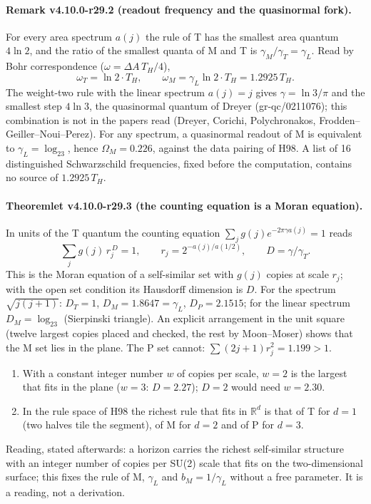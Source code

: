 \paragraph{Remark v4.10.0-r29.2 (readout frequency and the quasinormal fork).}
For every area spectrum \(a(j)\) the rule of T has the smallest area quantum \(4\ln2\), and the ratio of the smallest quanta of M and T is
\(\gamma_M/\gamma_T=\gamma_L\).  Read by Bohr correspondence (\(\omega=\Delta A\,T_H/4\)),
\[
\omega_T=\ln2\cdot T_H,\qquad \omega_M=\gamma_L\ln2\cdot T_H=1.2925\,T_H .
\]
The weight-two rule with the linear spectrum \(a(j)=j\) gives \(\gamma=\ln3/\pi\) and the smallest step \(4\ln3\), the quasinormal quantum of Dreyer
(gr-qc/0211076); this combination is not in the papers read (Dreyer, Corichi, Polychronakos, Frodden--Geiller--Noui--Perez).  For any spectrum, a
quasinormal readout of M is equivalent to \(\gamma_L=\log_23\), hence \(\Omega_M=0.226\), against the data pairing of H98.  A list of 16 distinguished
Schwarzschild frequencies, fixed before the computation, contains no source of \(1.2925\,T_H\).

\paragraph{Theoremlet v4.10.0-r29.3 (the counting equation is a Moran equation).}
In units of the T quantum the counting equation \(\sum_jg(j)e^{-2\pi\gamma a(j)}=1\) reads
\[
\sum_j g(j)\,r_j^{\,D}=1,\qquad r_j=2^{-a(j)/a(1/2)},\qquad D=\gamma/\gamma_T .
\]
This is the Moran equation of a self-similar set with \(g(j)\) copies at scale \(r_j\); with the open set condition its Hausdorff dimension is
\(D\).  For the spectrum \(\sqrt{j(j+1)}\): \(D_T=1\), \(D_M=1.8647=\gamma_L\), \(D_P=2.1515\); for the linear spectrum \(D_M=\log_23\) (Sierpinski
triangle).  An explicit arrangement in the unit square (twelve largest copies placed and checked, the rest by Moon--Moser) shows that the M set lies in
the plane.  The P set cannot: \(\sum(2j+1)r_j^2=1.199>1\).
\begin{enumerate}[leftmargin=2em]
\item[(a)] With a constant integer number \(w\) of copies per scale, \(w=2\) is the largest that fits in the plane (\(w=3\): \(D=2.27\)); \(D=2\) would
need \(w=2.30\).
\item[(b)] In the rule space of H98 the richest rule that fits in \(\mathbb R^d\) is that of T for \(d=1\) (two halves tile the segment), of M for
\(d=2\) and of P for \(d=3\).
\end{enumerate}
Reading, stated afterwards: a horizon carries the richest self-similar structure with an integer number of copies per SU(2) scale that fits on the
two-dimensional surface; this fixes the rule of M, \(\gamma_L\) and \(b_M=1/\gamma_L\) without a free parameter.  It is a reading, not a derivation.

